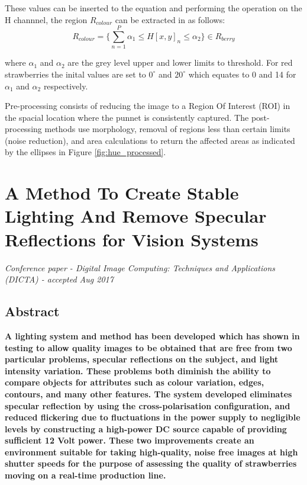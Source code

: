 \documentclass[fleqn,twoside]{article}
\begin{document}
These values can be inserted to the equation and performing the operation on the H channnel, the region $R_{colour}$ can be extracted in as follows:
\begin{equation}
R_{colour} = \bigg\{\sum_{n=1}^{P} \alpha_1 \leq H[x,y]_n \leq \alpha_2\bigg\} \in R_{berry}
\end{equation}


where $\alpha_1$ and $\alpha_2$ are the grey level upper and lower limits to threshold. For red strawberries the inital values are set to $0^{\circ}$ and $20^{\circ}$ which equates to 0 and 14 for $\alpha_1$ and $\alpha_2$ respectively.

Pre-processing consists of reducing the image to a Region Of Interest (ROI) in the spacial location where the punnet is consistently captured. The post-processing methods use morphology, removal of regions less than certain limits (noise reduction), and area calculations to return the affected areas as indicated by the ellipses in Figure \ref{fig:hue_processed}.



\newpage


\section{A Method To Create Stable Lighting And Remove Specular Reflections for Vision Systems}
\label{sec:paper_1}

\textit{Conference paper - Digital Image Computing: Techniques and Applications (DICTA) - accepted Aug 2017}


\subsection{Abstract}

\textbf{A lighting system and method has been developed which has shown in testing to allow quality images to be obtained that are free from two particular problems, specular reflections on the subject, and light intensity variation. These problems both diminish the ability to compare objects for attributes such as colour variation, edges, contours, and many other features. The system developed eliminates specular reflection by using the cross-polarisation configuration, and reduced flickering due to fluctuations in the power supply to negligible levels by constructing a high-power DC source capable of providing sufficient 12 Volt power. These two improvements create an environment suitable for taking high-quality, noise free images at high shutter speeds for the purpose of assessing the quality of strawberries moving on a real-time production line.}
\end{document}

